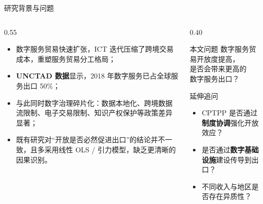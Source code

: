 \documentclass[aspectratio=169,10pt]{ctexbeamer}
\newcommand{\hl}[1]{\textcolor{XJTUBlue}{\textbf{#1}}}
\begin{document}
\begin{frame}{研究背景与问题}
  \begin{columns}[T,totalwidth=\textwidth]
    \begin{column}{0.55\textwidth}
      \begin{itemize}
        \item 数字服务贸易快速扩张，ICT 迭代压缩了跨境交易成本，重塑服务贸易分工格局；
        \item \hl{UNCTAD 数据}显示，2018 年数字服务已占全球服务出口 \alert{50\%}；
        \item 与此同时数字治理碎片化：数据本地化、跨境数据流限制、电子交易限制、知识产权保护等政策差异显著；
        \item 既有研究对“开放是否必然促进出口”的结论\alert{并不一致}，且多采用线性 OLS / 引力模型，缺乏更清晰的因果识别。
      \end{itemize}
    \end{column}
    \begin{column}{0.40\textwidth}
      \begin{block}{本文问题}
        \centering
        \large
        数字服务贸易开放度提高，\\
        是否会带来更高的\\
        数字服务出口？
      \end{block}
      \begin{block}{延伸追问}
        \footnotesize
        \begin{itemize}
          \item CPTPP 是否通过\hl{制度协调}强化开放效应？
          \item 是否通过\hl{数字基础设施}建设传导到出口？
          \item 不同收入与地区是否存在异质性？
        \end{itemize}
      \end{block}
    \end{column}
  \end{columns}
\end{frame}
\end{document}
